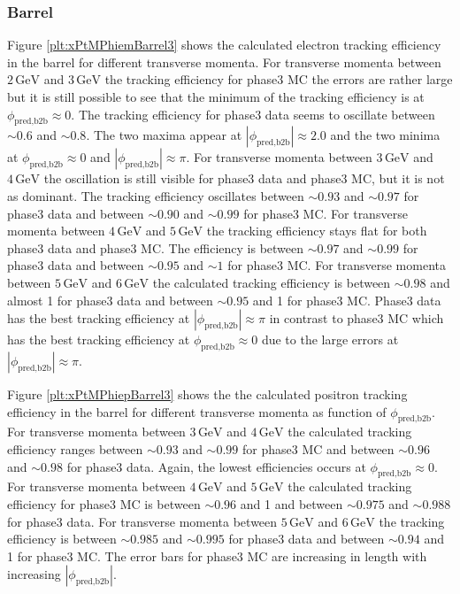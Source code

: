 \documentclass[a4paper,11pt,twosided,final,german,openbib,pdftex,listof=totoc,bibliography=totoc]{scrbook}
\begin{document}
\newpage
\subsubsection{Barrel}


Figure \ref{plt:xPtMPhiemBarrel3} shows the calculated electron tracking efficiency in the barrel for different transverse momenta.
For transverse momenta between $2\,\textrm{GeV}$ and $3\,\textrm{GeV}$ the tracking efficiency for phase3 MC the errors are rather large but it is still possible to see that the minimum of the tracking efficiency is at $\phi_{\textrm{pred,b2b}} \approx 0$. The tracking efficiency for phase3 data seems to oscillate between $\sim 0.6$ and $\sim 0.8$. The two maxima appear at $|\phi_{\textrm{pred,b2b}}| \approx 2.0$ and the two minima at $\phi_{\textrm{pred,b2b}} \approx 0$ and $|\phi_{\textrm{pred,b2b}}| \approx \pi$.
For transverse momenta between $3\,\textrm{GeV}$ and $4\,\textrm{GeV}$ the oscillation is still visible for phase3 data and phase3 MC, but it is not as dominant. The tracking efficiency oscillates between $\sim 0.93$ and  $\sim 0.97$ for phase3 data and between $\sim 0.90$ and $\sim 0.99$ for phase3 MC.
For transverse momenta between $4\,\textrm{GeV}$ and $5\,\textrm{GeV}$ the tracking efficiency stays flat for both phase3 data and phase3 MC. The efficiency is between $\sim 0.97$ and $\sim 0.99$ for phase3 data and between $\sim 0.95$ and $\sim 1$ for phase3 MC.
For transverse momenta between $5\,\textrm{GeV}$ and $6\,\textrm{GeV}$ the calculated tracking efficiency is between $\sim 0.98$ and almost 1 for phase3 data and between $\sim 0.95$ and 1 for phase3 MC. Phase3 data has the best tracking efficiency at $|\phi_{\textrm{pred,b2b}}| \approx \pi$ in contrast to phase3 MC which has the best tracking efficiency at $\phi_{\textrm{pred,b2b}} \approx 0$ due to the large errors at $|\phi_{\textrm{pred,b2b}}| \approx \pi$. 

Figure \ref{plt:xPtMPhiepBarrel3} shows the the calculated positron tracking efficiency in the barrel for different transverse momenta as function of $\phi_{\textrm{pred,b2b}}$.
For transverse momenta between $3\,\textrm{GeV}$ and $4\,\textrm{GeV}$ the calculated tracking efficiency ranges between $\sim 0.93$ and $\sim 0.99$ for phase3 MC and between $\sim 0.96$ and $\sim 0.98$ for phase3 data. Again, the lowest efficiencies occurs at $\phi _{\textrm{pred,b2b}}\approx 0$.
For transverse momenta between $4\,\textrm{GeV}$ and $5\,\textrm{GeV}$ the calculated tracking efficiency for phase3 MC is between $\sim 0.96$ and 1 and between $\sim 0.975$ and $\sim 0.988$ for phase3 data. 
For transverse momenta between $5\,\textrm{GeV}$ and $6\,\textrm{GeV}$ the tracking efficiency is between $\sim 0.985$ and $\sim 0.995$ for phase3 data and between $\sim 0.94$ and 1 for phase3 MC. The error bars for phase3 MC are increasing in length with increasing $|\phi_{\textrm{pred,b2b}}|$.
\end{document}

